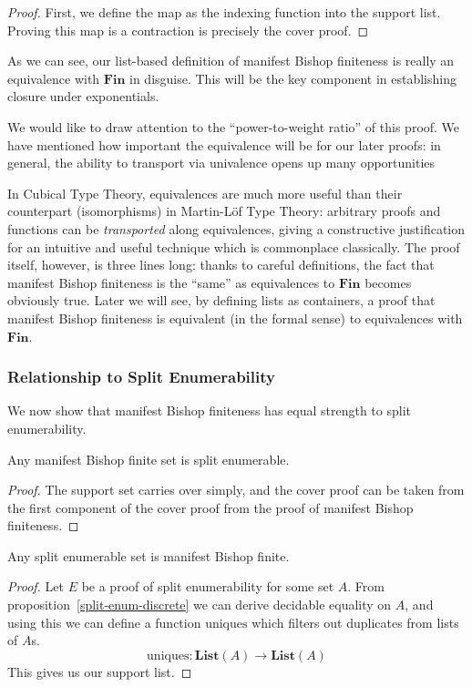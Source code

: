 \begin{refsection}
\begin{proof}
  First, we define the map as the indexing function into the support list.
  Proving this map is a contraction is precisely the cover proof.

\end{proof}

As we can see, our list-based definition of manifest Bishop finiteness is really
an equivalence with \(\mathbf{Fin}\) in disguise.
This will be the key component in establishing closure under exponentials.

We would like to draw attention to the ``power-to-weight ratio'' of this proof.
We have mentioned how important the equivalence will be for our later proofs: in
general, the ability to transport via univalence opens up many opportunities 

In Cubical Type Theory, equivalences are much more useful than their counterpart
(isomorphisms) in Martin-Löf  Type Theory: arbitrary proofs and functions can be
\emph{transported} along equivalences, giving a constructive justification for
an intuitive and useful technique which is commonplace classically.
The proof itself, however, is three lines long: thanks to careful definitions,
the fact that manifest Bishop finiteness is the ``same'' as equivalences to
\(\mathbf{Fin}\) becomes obviously true.
Later we will see, by defining lists as containers, a proof that manifest Bishop
finiteness is equivalent (in the formal sense) to equivalences with
\(\mathbf{Fin}\). 
\subsubsection{Relationship to Split Enumerability}
We now show that manifest Bishop finiteness has equal strength to split
enumerability.
\begin{lemma}
  Any manifest Bishop finite set is split enumerable.
\end{lemma}
\begin{proof}
  The support set carries over simply, and the cover proof can be taken from the
  first component of the cover proof from the proof of manifest Bishop
  finiteness.
\end{proof}
\begin{theorem} \label{split-enum-to-manifest-bishop}
  Any split enumerable set is manifest Bishop finite.
\end{theorem}
\begin{proof}
  Let \(E\) be a proof of split enumerability for some set \(A\).
  From proposition~\ref{split-enum-discrete} we can derive decidable equality on
  \(A\), and using this we can define a function \(\text{uniques}\) which filters
  out duplicates from lists of \(A\)s.
  \begin{equation}
    \text{uniques} : \textbf{List}(A) \rightarrow \textbf{List}(A)
  \end{equation}
  This gives us our support list.


\end{proof}
\end{refsection}
